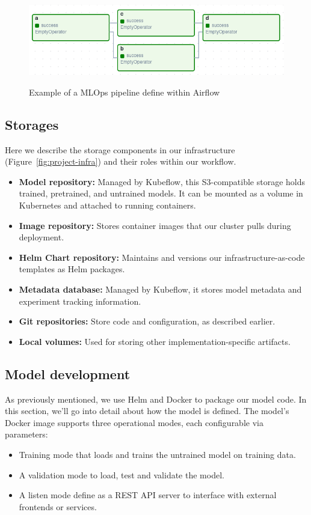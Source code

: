 \begin{figure}[!htbp]
    \centering
    \caption{Example of a MLOps pipeline define within Airflow}
    \includegraphics[scale=0.5]{images/project/data-ops-airflow-dag}
    \label{fig:project-ml-ops-airflow-dag}
\end{figure}

\subsection{Storages}\label{subsec:storage}
Here we describe the storage components in our infrastructure (Figure~\ref{fig:project-infra}) and their roles within our workflow.

\begin{itemize}
    \item \textbf{Model repository:} Managed by Kubeflow, this S3-compatible storage holds trained, pretrained, and untrained models.
    It can be mounted as a volume in Kubernetes and attached to running containers.
    \item \textbf{Image repository:} Stores container images that our cluster pulls during deployment.
    \item \textbf{Helm Chart repository:} Maintains and versions our infrastructure-as-code templates as Helm packages.
    \item \textbf{Metadata database:} Managed by Kubeflow, it stores model metadata and experiment tracking information.
    \item \textbf{Git repositories:} Store code and configuration, as described earlier.
    \item \textbf{Local volumes:} Used for storing other implementation-specific artifacts.
\end{itemize}

\subsection{Model development}\label{subsec:model-development}
As previously mentioned, we use Helm and Docker to package our model code.
In this section, we'll go into detail about how the model is defined.
The model's Docker image supports three operational modes, each configurable via parameters:
\begin{itemize}
    \item Training mode that loads and trains the untrained model on training data.
    \item A validation mode to load, test and validate the model.
    \item A listen mode define as a REST API server to interface with external frontends or services.
\end{itemize}

